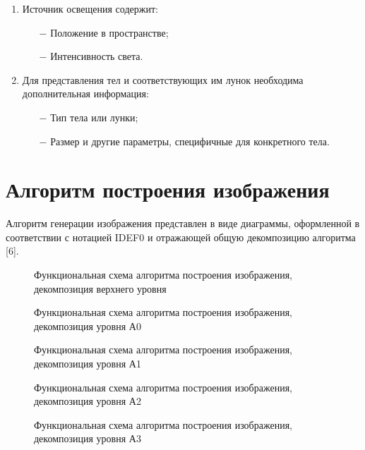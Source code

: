 \begin{enumerate}
    \item Источник освещения содержит:
    
    \begin{itemize}
        \item[$-$] Положение в пространстве;
        \item[$-$] Интенсивность света.
    \end{itemize}
    
    \item Для представления тел и соответствующих им лунок необходима дополнительная информация:
    
    \begin{itemize}
        \item[$-$] Тип тела или лунки;
        \item[$-$] Размер и другие параметры, специфичные для конкретного тела.
    \end{itemize}
\end{enumerate}
\section{Алгоритм построения изображения}

Алгоритм генерации изображения представлен в виде диаграммы, оформленной в соответствии с нотацией IDEF0 и отражающей общую декомпозицию алгоритма [6].
\begin{figure}[h]
	\centering
	
	\caption{Функциональная схема алгоритма построения изображения, декомпозиция верхнего уровня}
	\label{fig:classic}
\end{figure}
\begin{figure}[h]
	\centering
	
	\caption{Функциональная схема алгоритма построения изображения, декомпозиция уровня А0}
	\label{fig:classic}
\end{figure}
\begin{figure}[h]
	\centering
    
	\caption{Функциональная схема алгоритма построения изображения, декомпозиция уровня А1}
	\label{fig:classic}
\end{figure}
\begin{figure}[h]
	\centering
    
	\caption{Функциональная схема алгоритма построения изображения, декомпозиция уровня А2}
	\label{fig:classic}
\end{figure}
\begin{figure}[h]
	\centering
    
	\caption{Функциональная схема алгоритма построения изображения, декомпозиция уровня А3}
	\label{fig:classic}
\end{figure}
\clearpage

